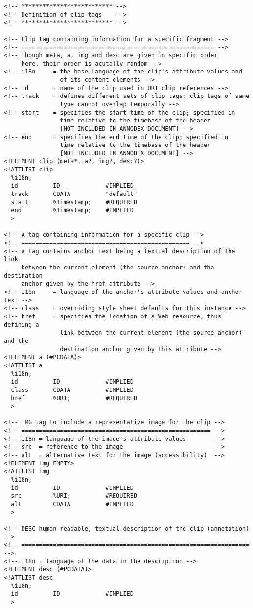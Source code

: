 \begin{verbatim}
<!-- ************************** -->
<!-- Definition of clip tags    -->
<!-- ************************** -->

<!-- Clip tag containing information for a specific fragment -->
<!-- ======================================================= -->
<!-- though meta, a, img and desc are given in specific order
     here, their order is acutally random -->
<!-- i18n     = the base language of the clip's attribute values and 
                of its content elements -->
<!-- id       = name of the clip used in URI clip references -->
<!-- track    = defines different sets of clip tags; clip tags of same 
                type cannot overlap temporally -->
<!-- start    = specifies the start time of the clip; specified in 
                time relative to the timebase of the header 
                [NOT INCLUDED IN ANNODEX DOCUMENT] -->
<!-- end      = specifies the end time of the clip; specified in 
                time relative to the timebase of the header 
                [NOT INCLUDED IN ANNODEX DOCUMENT] -->
<!ELEMENT clip (meta*, a?, img?, desc?)>
<!ATTLIST clip
  %i18n;
  id          ID             #IMPLIED
  track       CDATA          "default"
  start       %Timestamp;    #REQUIRED
  end         %Timestamp;    #IMPLIED
  >

<!-- A tag containing information for a specific clip -->
<!-- ================================================ -->
<!-- a tag contains anchor text being a textual description of the link 
     between the current element (the source anchor) and the destination
     anchor given by the href attribute -->
<!-- i18n     = language of the anchor's attribute values and anchor text -->
<!-- class    = overriding style sheet defaults for this instance -->
<!-- href     = specifies the location of a Web resource, thus defining a 
                link between the current element (the source anchor) and the 
                destination anchor given by this attribute -->
<!ELEMENT a (#PCDATA)>
<!ATTLIST a
  %i18n;
  id          ID             #IMPLIED
  class       CDATA          #IMPLIED
  href        %URI;          #REQUIRED
  >

<!-- IMG tag to include a representative image for the clip -->
<!-- ====================================================== -->
<!-- i18n = language of the image's attribute values        -->
<!-- src  = reference to the image                          -->
<!-- alt  = alternative text for the image (accessibility)  -->
<!ELEMENT img EMPTY>
<!ATTLIST img
  %i18n;
  id          ID             #IMPLIED
  src         %URI;          #REQUIRED
  alt         CDATA          #IMPLIED
  >

<!-- DESC human-readable, textual description of the clip (annotation) -->
<!-- ================================================================= -->
<!-- i18n = language of the data in the description -->
<!ELEMENT desc (#PCDATA)>
<!ATTLIST desc
  %i18n;
  id          ID             #IMPLIED
  >
\end{verbatim}
\normalsize
 